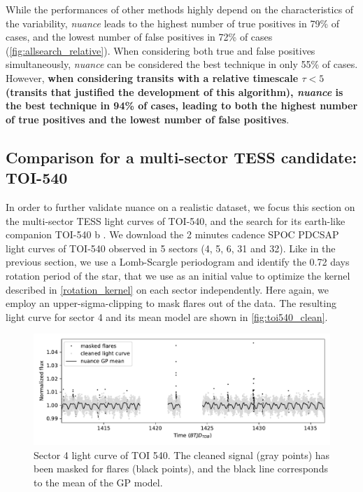 \documentclass[modern]{aastex631}
\newcommand{\nuancemethod}{\textit{nuance}}
\newcommand{\nuance}{\nuancemethod{}}
\begin{document}
While the performances of other methods highly depend on the characteristics of the variability, \nuance{} leads to the highest number of true positives in 79\% of cases, and the lowest number of false positives in 72\% of cases (\autoref{fig:allsearch_relative}). When considering both true and false positives simultaneously, \nuance{} can be considered the best technique in only 55\% of cases. However, \textbf{when considering transits with a relative timescale $\tau < 5$ (transits that justified the development of this algorithm), \nuancemethod{} is the best technique in 94\% of cases, leading to both the highest number of true positives and the lowest number of false positives}.

\subsection{Comparison for a multi-sector TESS candidate: TOI-540}\label{toi540}

In order to further validate nuance on a realistic dataset, we focus this section on the multi-sector TESS light curves of TOI-540, and the search for its earth-like companion TOI-540 b \citep{TOI540}. We download the 2 minutes cadence SPOC PDCSAP light curves of TOI-540 observed in 5 sectors (4, 5, 6, 31 and 32). Like in the previous section, we use a Lomb-Scargle periodogram and identify the 0.72 days rotation period of the star, that we use as an initial value to optimize the kernel described in \autoref{rotation_kernel} on each sector independently. Here again, we employ an upper-sigma-clipping to mask flares out of the data. The resulting light curve for sector 4 and its mean model are shown in \autoref{fig:toi540_clean}.
\begin{figure}[H]
    \begin{centering}
        \includegraphics[width=\linewidth]{../workflows/comparison_toi/figures/TOI 540/4.pdf}
        \caption{Sector 4 light curve of TOI 540. The cleaned signal (gray points) has been masked for flares (black points), and the black line corresponds to the mean of the GP model.}
        \label{fig:toi540_clean}
    \end{centering}
\end{figure}
\end{document}
